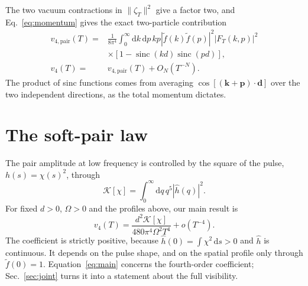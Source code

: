 \documentclass[11pt,a4paper]{article}
\newcommand{\dd}{\mathrm{d}}
\newcommand{\sinc}{\operatorname{sinc}}
\newcommand{\cK}{\mathcal{K}}
\begin{document}
The two vacuum contractions in $\|\zeta_T\|^2$ give a factor two, and Eq.~\eqref{eq:momentum} gives the exact two-particle contribution
\begin{align}
 v_{4,\mathrm{pair}}(T)={}&\frac{1}{8\pi^4}\int_0^{\infty}\dd k\,\dd p\,kp
 |\widetilde f(k)\widetilde f(p)|^2|F_T(k,p)|^2\nonumber\\
 &\times[1-\sinc(kd)\sinc(pd)],\label{eq:pairvisibility}\\
 v_4(T)={}&v_{4,\mathrm{pair}}(T)+O_N(T^{-N}).\label{eq:pairdominates}
\end{align}
The product of sinc functions comes from averaging $\cos[(\bm k+\bm p)\cdot\bm d]$ over the two independent directions, as the total momentum dictates.

\section{The soft-pair law}
\label{sec:law}

The pair amplitude at low frequency is controlled by the square of the pulse, $h(s)=\chi(s)^2$, through
\begin{equation}
 \cK[\chi]=\int_0^{\infty}\dd q\,q^5|\widehat h(q)|^2.\label{eq:K}
\end{equation}
For fixed $d>0$, $\Omega>0$ and the profiles above, our main result is
\begin{equation}
 \boxed{\displaystyle
 v_4(T)=\frac{d^2\cK[\chi]}{480\pi^4\Omega^2T^4}+o(T^{-4}).}
 \label{eq:main}
\end{equation}
The coefficient is strictly positive, because $\widehat h(0)=\int\chi^2\,\dd s>0$ and $\widehat h$ is continuous. It depends on the pulse shape, and on the spatial profile only through $\widetilde f(0)=1$. Equation~\eqref{eq:main} concerns the fourth-order coefficient; Sec.~\ref{sec:joint} turns it into a statement about the full visibility.
\end{document}
